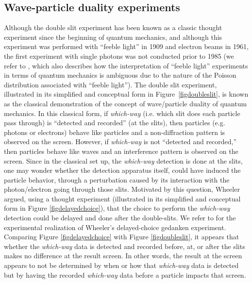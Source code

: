 \documentclass[11pt]{article}
\theoremstyle{definition}
\begin{document}
\subsection{Wave-particle duality experiments}
Although the double slit experiment has been known as a classic thought experiment \cite{feynmanvol3} since the beginning of quantum mechanics, and although this experiment was performed with ``feeble light'' \cite{taylor1909interference} in 1909 and electron beams \cite{jonsson1961elektroneninterferenzen} in 1961, the first  experiment with single photons was not conducted prior to 1985 (we refer to \cite{aspect1987wave}, which also describes how the interpretation of ``feeble light'' experiments in terms of quantum mechanics is ambiguous due to the nature of the Poisson distribution associated with ``feeble light'').
The double slit experiment, illustrated in its simplified and conceptual form in Figure~\ref{figdoubleslit}, is known as the classical demonstration of the concept of wave/particle  duality of quantum mechanics. In this classical form, if \emph{which-way} (i.e.   which slit does each particle pass through) is   ``detected and recorded'' (at the slits), then  particles (e.g. photons or electrons) behave like particles and a non-diffraction pattern is observed on the screen. However, if \emph{which-way} is not  ``detected and recorded,'' then  particles behave like waves and an interference pattern is observed on the screen.
Since in the classical set up, the \emph{which-way} detection is done at the slits, one may wonder whether the detection apparatus itself, could have induced the particle behavior, through a perturbation caused by its interaction with the photon/electron going through those slits.  Motivated by this question, Wheeler  \cite{wheeler1978past} argued, using a thought experiment (illustrated in its simplified and conceptual form in Figure \ref{figdelayedchoice}), that the   choice to perform the \emph{which-way} detection could be delayed and done after  the double-slits. We refer to \cite{jacques2007experimental} for the experimental realization of Wheeler's delayed-choice gedanken experiment. Comparing Figure \ref{figdelayedchoice} with Figure \ref{figdoubleslit}, it appears that whether the \emph{which-way} data is detected and recorded before, at, or after the slits makes no difference at the result screen.
In other words, the result at the screen appears to not be determined by when or how that \emph{which-way} data is detected but by
having the recorded \emph{which-way} data before a particle impacts that screen.
\end{document}
